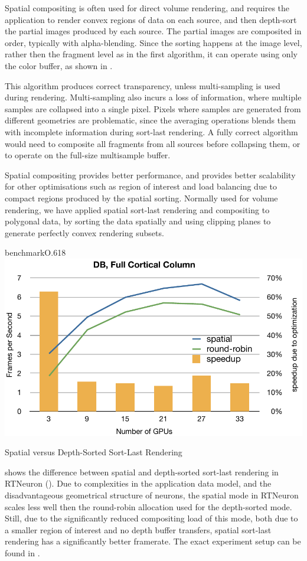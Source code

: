 Spatial compositing is often used for direct volume rendering, and requires the
application to render convex regions of data on each source, and then depth-sort
the partial images produced by each source. The partial images are composited in
order, typically with alpha-blending. Since the sorting happens at the image
level, rather then the fragment level as in the first algorithm, it can operate
using only the color buffer, as shown in .

This algorithm produces correct transparency, unless multi-sampling is used
during rendering. Multi-sampling also incurs a loss of information, where
multiple samples are collapsed into a single pixel. Pixels where samples are
generated from different geometries are problematic, since the averaging
operations blends them with incomplete information during sort-last rendering.
A fully correct algorithm would need to composite all fragments from all
sources before collapsing them, or to operate on the full-size multisample
buffer.

Spatial compositing provides better performance, and provides better
scalability for other optimisations such as region of interest and load
balancing due to compact regions produced by the spatial sorting. Normally used
for volume rendering, we have applied spatial sort-last rendering and
compositing to polygonal data, by sorting the data spatially and using clipping
planes to generate perfectly convex rendering subsets.

\begin{wrapfloat}{benchmark}{O}{.618\textwidth}
 \includegraphics[width=.618\textwidth]{results/dbSpatial}
 {\caption{\label{rDBSpatial}Spatial versus Depth-Sorted Sort-Last Rendering}}
\end{wrapfloat}

 shows the difference between spatial and depth-sorted
sort-last rendering in RTNeuron (). Due to complexities in the
application data model, and the disadvantageous geometrical structure of
neurons, the spatial mode in RTNeuron scales less well then the round-robin
allocation used for the depth-sorted mode. Still, due to the significantly
reduced compositing load of this mode, both due to a smaller region of interest
and no depth buffer transfers, spatial sort-last rendering has a significantly
better framerate. The exact experiment setup can be found in \cite{EBAHMP:12}.

